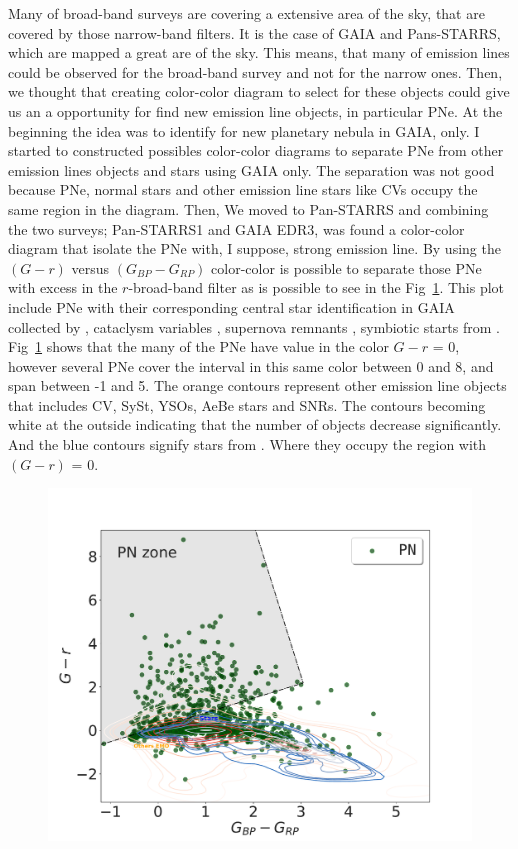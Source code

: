 \documentclass[fleqn,usenatbib]{mnras}
\begin{document}
Many of broad-band surveys are covering a extensive area of the sky, that
are covered by those narrow-band filters. It is the case of GAIA and Pans-STARRS, which
are mapped a great are of the sky.
This means, that many of emission lines could be observed for the broad-band
survey and not for the narrow ones. Then, we thought that creating color-color
diagram to select for these objects
could give us an a opportunity for find new emission line objects, in particular PNe.
At the beginning the idea was to identify for new planetary nebula in GAIA, only.
I started to constructed possibles color-color diagrams to separate PNe from
other emission lines objects and stars using GAIA only. The separation was not
good because PNe, normal stars and other emission line stars like CVs occupy the
same region in the diagram. Then, We moved to Pan-STARRS and combining the two
surveys; Pan-STARRS1 and GAIA EDR3, was found a color-color diagram that isolate the PNe
with, I suppose, strong \ha{} emission line. By using the \((G - r)\) versus \((G_{BP} - G_{RP})\)
color-color is possible to separate those PNe with excess in the $r$-broad-band
filter as is possible to see in the Fig~\ref{fig:gaia-ps}. This plot include PNe with their corresponding central star identification
in GAIA collected by \citet{Gonzalez:2021}, 
cataclysm variables \citep{Downes:2006}, supernova remnants \citep{Green:2019}, symbiotic starts
from \citet{Akras:2019a}.  
Fig~\ref{fig:gaia-ps} shows that the many of the PNe have value in
the color \(G - r\) = 0, however several PNe cover the interval in this
same color between 0 and 8, and span between -1 and 5.
The orange contours represent other emission line objects that includes CV, SySt,
YSOs, AeBe stars and SNRs. The contours becoming white at the outside indicating
that the number of objects decrease significantly. And the blue contours signify
stars from \citet{Smart:2021}. Where they occupy the region with \((G - r)\) = 0.

\begin{figure}
\centering
\includegraphics[width=0.9\linewidth]{Figs/color-diagram-ps-gaiaEDR3.pdf}
  \caption{} 
  \label{fig:gaia-ps}
\end{figure}
\end{document}
